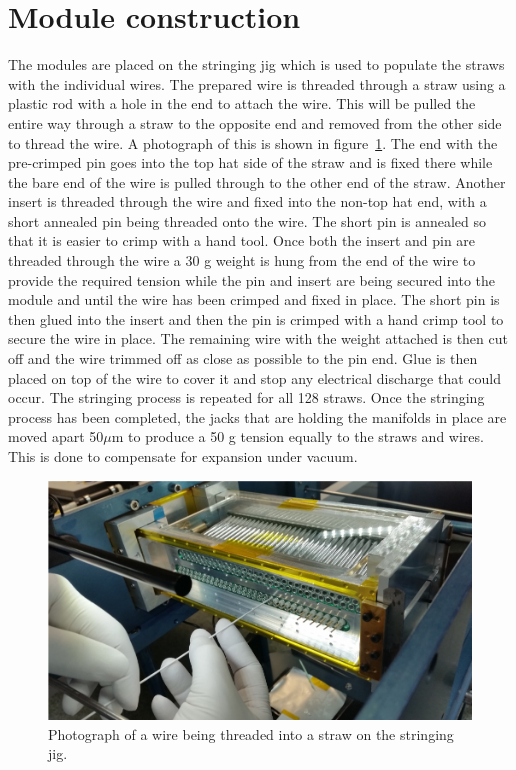 \section{Module construction}

The modules are placed on the stringing jig which is used to populate the straws with the individual wires. The prepared wire is threaded through a straw using a plastic rod with a hole in the end to attach the wire. This will be pulled the entire way through a straw to the opposite end and removed from the other side to thread the wire. A photograph of this is shown in figure~\ref{fig:string}. The end with the pre-crimped pin goes into the top hat side of the straw and is fixed there while the bare end of the wire is pulled through to the other end of the straw. Another insert is threaded through the wire and fixed into the non-top hat end, with a short annealed pin being threaded onto the wire. The short pin is annealed so that it is easier to crimp with a hand tool. Once both the insert and pin are threaded through the wire a 30 g weight is hung from the end of the wire to provide the required tension while the pin and insert are being secured into the module and until the wire has been crimped and fixed in place. The short pin is then glued into the insert and then the pin is crimped with a hand crimp tool to secure the wire in place. The remaining wire with the weight attached is then cut off and the wire trimmed off as close as possible to the pin end. Glue is then placed on top of the wire to cover it and stop any electrical discharge that could occur. The stringing process is repeated for all 128 straws. Once the stringing process has been completed, the jacks that are holding the manifolds in place are moved apart 50$\mu$m to produce a 50 g tension equally to the straws and wires. This is done to compensate for expansion under vacuum.

\begin{figure}[ht]
\centering
\includegraphics[scale=0.80]{Figures/string}
\decoRule
\caption{Photograph of a wire being threaded into a straw on the stringing jig.}
\label{fig:string}
\end{figure}

